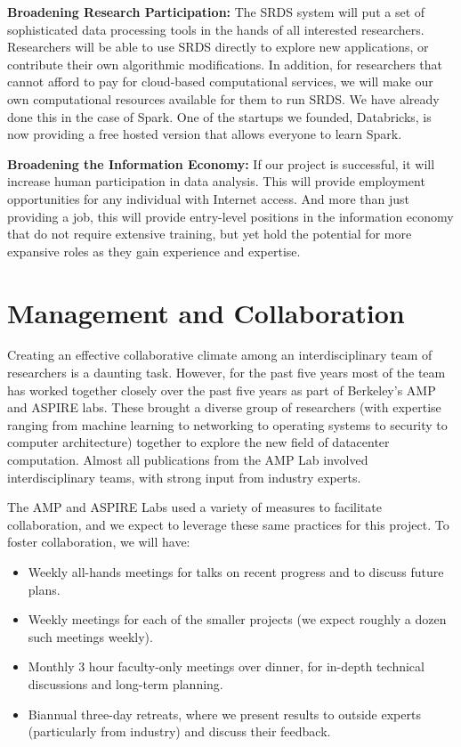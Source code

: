 {\bf Broadening Research Participation:} The SRDS system will put a set of sophisticated data processing tools in the hands of all interested researchers.  Researchers will be able to use SRDS directly to explore new applications, or contribute their own algorithmic modifications.  In addition, for researchers that cannot afford to pay for cloud-based computational services, we will make our own computational resources available for them to run SRDS. We have already done this in the case of Spark. One of the startups we founded, Databricks, is now providing a free hosted version that allows everyone to learn Spark.

{\bf Broadening the Information Economy:} If our project is successful, it will increase human participation in data analysis.  This will provide employment opportunities for any individual with Internet access.  And more than just providing a job, this will provide entry-level positions in the information economy that do not require extensive training, but yet hold the potential for more expansive roles as they gain experience and expertise.  

\section{Management and Collaboration}

Creating an effective collaborative climate among an interdisciplinary team of researchers is a daunting task. However, for the past five years most of the team has worked together closely over the past five years as part of Berkeley's AMP and ASPIRE labs.  These brought a diverse group of researchers (with expertise ranging from machine learning to networking to operating systems to security to computer architecture) together to explore the new field of datacenter computation. Almost all publications from the AMP Lab involved interdisciplinary teams, with strong input from industry experts.

The AMP and ASPIRE Labs used a variety of measures to facilitate collaboration, and we expect to leverage these same practices for this project.   To foster collaboration, we will have:

\begin{itemize}[noitemsep,topsep=0pt,parsep=0pt,partopsep=0pt]
\item Weekly all-hands meetings for talks on recent progress and to discuss future plans.
\item  Weekly meetings for each of the smaller projects (we expect roughly a dozen such meetings weekly).
\item  Monthly 3 hour faculty-only meetings over dinner, for in-depth technical discussions and long-term planning.
\item  Biannual three-day retreats, where we present results to outside experts (particularly from industry) and discuss their feedback.
\end{itemize}

